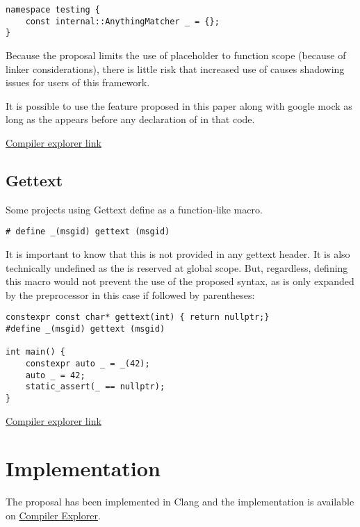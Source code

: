 \documentclass{wg21}
\begin{document}
{\begin{lstlisting}[style=color]
namespace testing {
    const internal::AnythingMatcher _ = {};
}
\end{lstlisting}

Because the proposal limits the use of placeholder to function scope (because of linker considerations),
there is little risk that increased use of \tcode{_} causes shadowing issues for users of this framework.

It is possible to use the feature proposed in this paper along with google mock as long as the 
appears before any declaration of \tcode{_} in that code.

\href{https://godbolt.org/z/EghbHF}{Compiler explorer link}

\subsection{Gettext}

Some projects using Gettext define \tcode{_} as a function-like macro.

\begin{lstlisting}[style=color]
# define _(msgid) gettext (msgid)
\end{lstlisting}

It is important to know that this is not provided in any gettext header.
It is also technically undefined as the \tcode{_} is reserved at global scope.
But, regardless, defining this macro would not prevent the use of the proposed syntax, as \tcode{_} is only
expanded by the preprocessor in this case if followed by parentheses:

\begin{lstlisting}[style=color]
constexpr const char* gettext(int) { return nullptr;} 
#define _(msgid) gettext (msgid)

int main() {
    constexpr auto _ = _(42);
    auto _ = 42;
    static_assert(_ == nullptr);
}

\end{lstlisting}

\href{https://godbolt.org/z/FRFg9-}{Compiler explorer link}

\section{Implementation}

The proposal has been implemented in Clang and the implementation is available on \href{https://godbolt.org/z/5lmnfN}{Compiler Explorer}.

}
\end{document}
